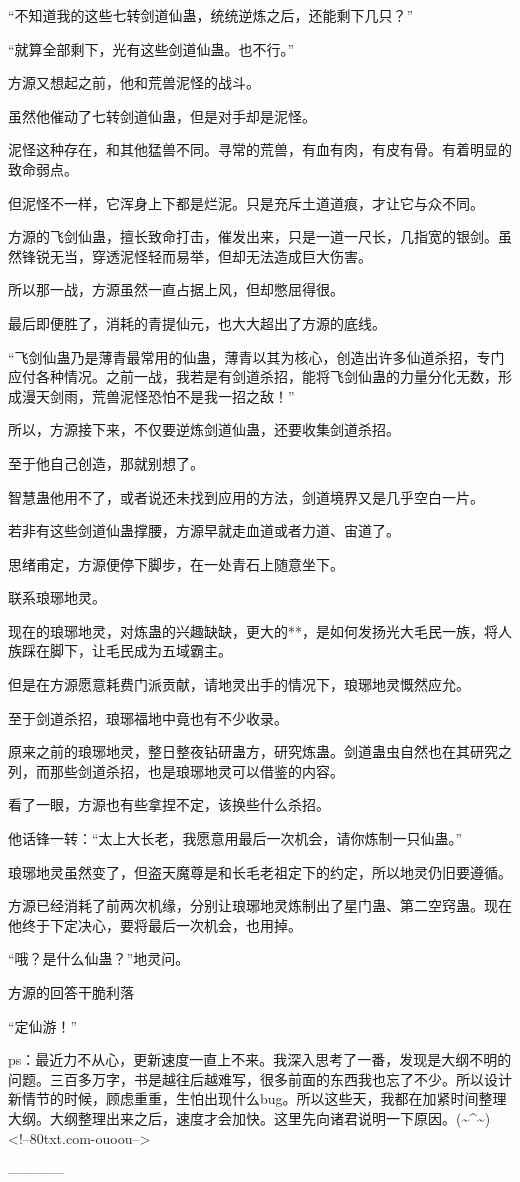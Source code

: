 \begin{this_body}
“不知道我的这些七转剑道仙蛊，统统逆炼之后，还能剩下几只？”

“就算全部剩下，光有这些剑道仙蛊。也不行。”

方源又想起之前，他和荒兽泥怪的战斗。

虽然他催动了七转剑道仙蛊，但是对手却是泥怪。

泥怪这种存在，和其他猛兽不同。寻常的荒兽，有血有肉，有皮有骨。有着明显的致命弱点。

但泥怪不一样，它浑身上下都是烂泥。只是充斥土道道痕，才让它与众不同。

方源的飞剑仙蛊，擅长致命打击，催发出来，只是一道一尺长，几指宽的银剑。虽然锋锐无当，穿透泥怪轻而易举，但却无法造成巨大伤害。

所以那一战，方源虽然一直占据上风，但却憋屈得很。

最后即便胜了，消耗的青提仙元，也大大超出了方源的底线。

“飞剑仙蛊乃是薄青最常用的仙蛊，薄青以其为核心，创造出许多仙道杀招，专门应付各种情况。之前一战，我若是有剑道杀招，能将飞剑仙蛊的力量分化无数，形成漫天剑雨，荒兽泥怪恐怕不是我一招之敌！”

所以，方源接下来，不仅要逆炼剑道仙蛊，还要收集剑道杀招。

至于他自己创造，那就别想了。

智慧蛊他用不了，或者说还未找到应用的方法，剑道境界又是几乎空白一片。

若非有这些剑道仙蛊撑腰，方源早就走血道或者力道、宙道了。

思绪甫定，方源便停下脚步，在一处青石上随意坐下。

联系琅琊地灵。

现在的琅琊地灵，对炼蛊的兴趣缺缺，更大的**，是如何发扬光大毛民一族，将人族踩在脚下，让毛民成为五域霸主。

但是在方源愿意耗费门派贡献，请地灵出手的情况下，琅琊地灵慨然应允。

至于剑道杀招，琅琊福地中竟也有不少收录。

原来之前的琅琊地灵，整日整夜钻研蛊方，研究炼蛊。剑道蛊虫自然也在其研究之列，而那些剑道杀招，也是琅琊地灵可以借鉴的内容。

看了一眼，方源也有些拿捏不定，该换些什么杀招。

他话锋一转：“太上大长老，我愿意用最后一次机会，请你炼制一只仙蛊。”

琅琊地灵虽然变了，但盗天魔尊是和长毛老祖定下的约定，所以地灵仍旧要遵循。

方源已经消耗了前两次机缘，分别让琅琊地灵炼制出了星门蛊、第二空窍蛊。现在他终于下定决心，要将最后一次机会，也用掉。

“哦？是什么仙蛊？”地灵问。

方源的回答干脆利落

“定仙游！”

ps：最近力不从心，更新速度一直上不来。我深入思考了一番，发现是大纲不明的问题。三百多万字，书是越往后越难写，很多前面的东西我也忘了不少。所以设计新情节的时候，顾虑重重，生怕出现什么bug。所以这些天，我都在加紧时间整理大纲。大纲整理出来之后，速度才会加快。这里先向诸君说明一下原因。(\~{}\^{}\~{})<!--80txt.com-ouoou-->

------------

\end{this_body}

